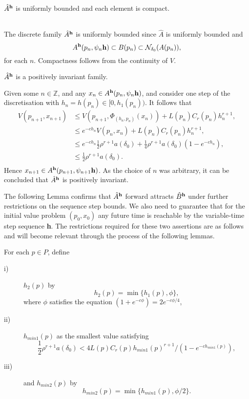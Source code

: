 \begin{lemma}
  $\hat{A}^{{\bf h}}$ is uniformly bounded and each element is compact.
\end{lemma}
\begin{prf}
  \hfill \\
  The discrete family $\hat{A}^{{\bf h}}$ is uniformly bounded since $\hat{A}$ is
  uniformly bounded and
  \[ A^{{\bf h}}(p_n,\psi_n{\bf h}) \subset B(p_n) \subset
             \mathcal{N}_{\delta_0}(A(p_n)), \]
  for each $n$. Compactness follows from the continuity of $V$.
\end{prf}

\begin{lemma}
  $\hat{A}^{{\bf h}}$ is a positively invariant family.
\end{lemma}
\begin{prf}
Given some $n \in \mathbb{Z}$, and any $x_n \in A^{{\bf h}}(p_n, \psi_n{\bf
h})$, and consider one step of the discretisation with $h_{n} =
h(p_n) \in [0, h_1(p_n))$. It follows that
\begin{align*}
  V( p_{n+1}, x_{n+1}) &\leq V( p_{n+1}, \Phi_{(h_n, p_n)}(x_n) ) +
            L(p_n)C_r(p_n)h_n^{r+1}, \\
  &\leq e^{-ch_n} V( p_n, x_n) + L(p_n)C_r(p_n)h_n^{r+1}, \\
  &\leq e^{-ch_n} \frac{1}{2} \rho^{r+1} a(\delta_0) + \frac{1}{4}
            \rho^{r+1} a(\delta_0) (1 - e^{-ch_n}), \\
  &\leq \frac{1}{2} \rho^{r+1} a(\delta_0). \\
\end{align*}
Hence $x_{n+1} \in A^{{\bf h}}(p_{n+1},\psi_{n+1}{\bf h})$. As the choice of
$n$ was arbitrary, it can be concluded that $\hat{A}^{{\bf h}}$ is positively
invariant.
\end{prf}

The following Lemma confirms that $\hat{A}^{{\bf h}}$
forward attracts $\hat{B}^{{\bf h}}$ under further restrictions on the
sequence step bounds. We also need to guarantee that for the
initial value problem $(p_0, x_0)$ any future time is reachable by
the variable-time step sequence {\bf h}. The restrictions required
for these two assertions are as follows and will become relevant
through the process of the following lemmas.

For each $p \in P$, define
\begin{description}
\item[i)] $h_2(p)$ by
\begin{equation*}
h_2(p) = \min \{ h_1(p), \phi \},
\end{equation*}
where $\phi$ satisfies the equation $(1 + e^{-c\phi}) =
2e^{-c\phi/4}$,
\item[ii)]
$h_{min1}(p)$ as the smallest value satisfying
\begin{equation}\label{eqhmin1}
\frac{1}{2}\rho^{r+1} a(\delta_0) < 4 L(p)C_r(p) h_{min1}(p)^{r+1} / (1 -
       e^{-ch_{min1}(p)}),
\end{equation}
\item[iii)] and $h_{min2}(p)$ by
\[ h_{min2}(p) = \min \{ h_{min1}(p), \phi/2 \}. \]
\end{description}

